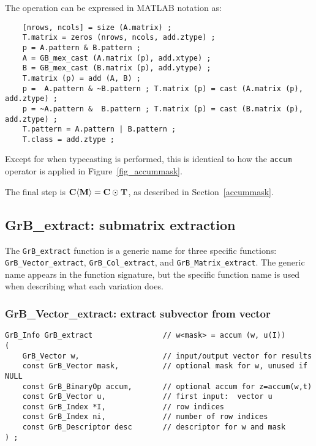 \documentclass[12pt]{article}
\begin{document}
\vspace{0.05in}
The operation can be expressed in MATLAB notation as:
    {\footnotesize
    \begin{verbatim}
    [nrows, ncols] = size (A.matrix) ;
    T.matrix = zeros (nrows, ncols, add.ztype) ;
    p = A.pattern & B.pattern ;
    A = GB_mex_cast (A.matrix (p), add.xtype) ;
    B = GB_mex_cast (B.matrix (p), add.ytype) ;
    T.matrix (p) = add (A, B) ;
    p =  A.pattern & ~B.pattern ; T.matrix (p) = cast (A.matrix (p), add.ztype) ;
    p = ~A.pattern &  B.pattern ; T.matrix (p) = cast (B.matrix (p), add.ztype) ;
    T.pattern = A.pattern | B.pattern ;
    T.class = add.ztype ; \end{verbatim} }
Except for when typecasting is performed, this is identical to how the
\verb'accum' operator is applied in Figure~\ref{fig_accummask}.

The final step is ${\bf C \langle M \rangle  = C \odot T}$, as described in
Section~\ref{accummask}.

\newpage
\subsection{{\sf GrB\_extract:} submatrix extraction } %
\label{extract}

The \verb'GrB_extract' function is a generic name for three specific functions:
\verb'GrB_Vector_extract', \verb'GrB_Col_extract', and
\verb'GrB_Matrix_extract'.  The generic name appears in the function signature,
but the specific function name is used when describing what each variation
does.

\subsubsection{{\sf GrB\_Vector\_extract:} extract subvector from vector}
\label{extract_vector}

\begin{mdframed}[userdefinedwidth=6in]
{\footnotesize
\begin{verbatim}
GrB_Info GrB_extract                // w<mask> = accum (w, u(I))
(
    GrB_Vector w,                   // input/output vector for results
    const GrB_Vector mask,          // optional mask for w, unused if NULL
    const GrB_BinaryOp accum,       // optional accum for z=accum(w,t)
    const GrB_Vector u,             // first input:  vector u
    const GrB_Index *I,             // row indices
    const GrB_Index ni,             // number of row indices
    const GrB_Descriptor desc       // descriptor for w and mask
) ;
\end{verbatim} } \end{mdframed}
\end{document}
